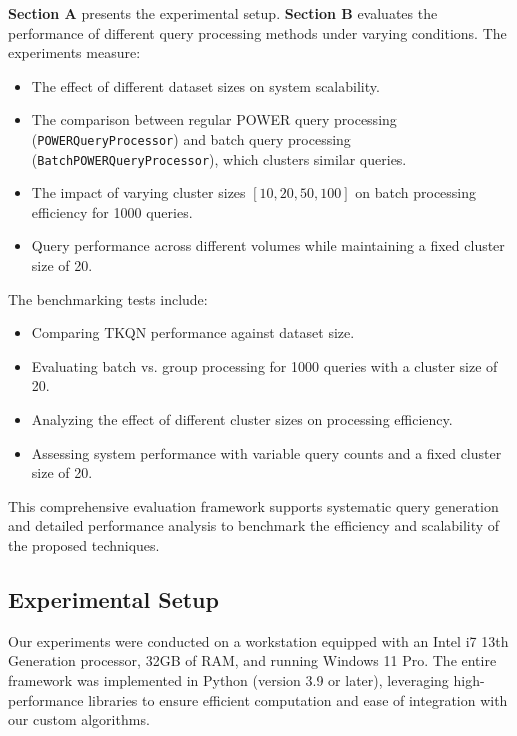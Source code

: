 \documentclass[conference]{IEEEtran}
\begin{document}
\textbf{Section A} presents the experimental setup. \textbf{Section B} evaluates the performance of different query processing methods under varying conditions. 
The experiments measure:
\begin{itemize}
    \item The effect of different dataset sizes on system scalability.
    \item The comparison between regular POWER query processing (\texttt{POWERQueryProcessor}) and batch query processing (\texttt{BatchPOWERQueryProcessor}), which clusters similar queries.
    \item The impact of varying cluster sizes \([10, 20, 50, 100]\) on batch processing efficiency for 1000 queries.
    \item Query performance across different volumes while maintaining a fixed cluster size of 20.
\end{itemize}
The benchmarking tests include:
\begin{itemize}
    \item Comparing TKQN performance against dataset size.
    \item Evaluating batch vs. group processing for 1000 queries with a cluster size of 20.
    \item Analyzing the effect of different cluster sizes on processing efficiency.
    \item Assessing system performance with variable query counts and a fixed cluster size of 20.
\end{itemize}

This comprehensive evaluation framework supports systematic query generation and detailed performance analysis to benchmark the efficiency and scalability of the proposed techniques.
\subsection{\textbf{Experimental Setup}}
Our experiments were conducted on a workstation equipped with an Intel i7 13th Generation processor, 32GB of RAM, and running Windows 11 Pro. The entire framework was implemented in Python (version 3.9 or later), leveraging high-performance libraries to ensure efficient computation and ease of integration with our custom algorithms.
\end{document}
